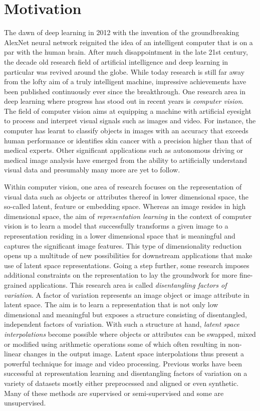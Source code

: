 \documentclass[12pt,a4paper]{article}
\begin{document}
\section{Motivation}
The dawn of deep learning in 2012 with the invention of the groundbreaking AlexNet neural network reignited the idea of an intelligent computer that is on a par with the human brain. After much disappointment in the late 21st century, the decade old research field of artificial intelligence and deep learning in particular was revived around the globe. While today research is still far away from the lofty aim of a truly intelligent machine, impressive achievements have been published continuously ever since the breakthrough. One research area in deep learning where progress has stood out in recent years is \textit{computer vision}. The field of computer vision aims at equipping a machine with artificial eyesight to process and interpret visual signals such as images and video. For instance, the computer has learnt to classify objects in images with an accuracy that exceeds human performance or identifies skin cancer with a precision higher than that of medical experts. Other significant applications such as autonomous driving or medical image analysis have emerged from the ability to artificially understand visual data and presumably many more are yet to follow. 

Within computer vision, one area of research focuses on the representation of visual data such as objects or attributes thereof in lower dimensional space, the so-called latent, feature or embedding space. Whereas an image resides in high dimensional space, the aim of \textit{representation learning} in the context of computer vision is to learn a model that successfully transforms a given image to a representation residing in a lower dimensional space that is meaningful and captures the significant image features. This type of dimensionality reduction opens up a multitude of new possibilities for downstream applications that make use of latent space representations. Going a step further, some research imposes additional constraints on the representation to lay the groundwork for more fine-grained applications. This research area is called \textit{disentangling factors of variation}. A factor of variation represents an image object or image attribute in latent space. The aim is to learn a representation that is not only low dimensional and meaningful but exposes a structure consisting of disentangled, independent factors of variation. With such a structure at hand, \textit{latent space interpolations} become possible where objects or attributes can be swapped, mixed or modified using arithmetic operations some of which often resulting in non-linear changes in the output image. Latent space interpolations thus present a powerful technique for image and video processing. Previous works have been successful at representation learning and disentangling factors of variation on a variety of datasets mostly either preprocessed and aligned or even synthetic. Many of these methods are supervised or semi-supervised and some are unsupervised.
\end{document}
